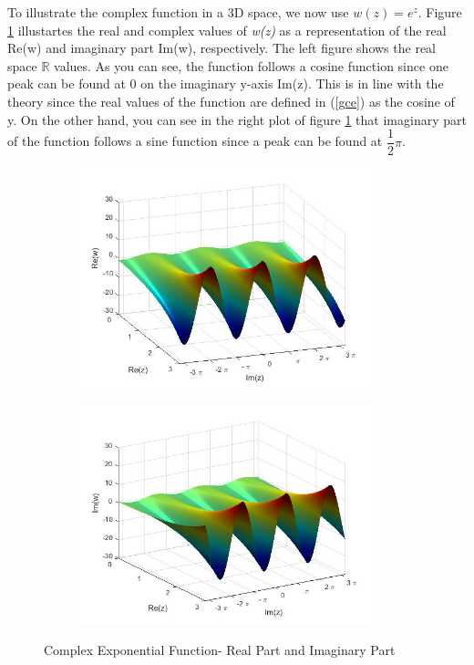 \documentclass[a4paper,11pt]{article}
\begin{document}
To illustrate the complex function in a 3D space,  we now use $w(z)=e^z$.
Figure \ref{plot12} illustartes the real and complex values of \textit{w(z)} as a representation of the real Re(w) and imaginary part Im(w), respectively. The left figure shows the real space $\mathbb{R}$ values. As you can see, the function follows a cosine function since one peak can be found at 0 on the imaginary y-axis Im(z). This is in line with the theory since the real values of the function are defined in (\ref{gce}) as the cosine of y. On the other hand, you can see in the right plot of figure \ref{plot12} that imaginary part of the function follows a sine function since a peak can be found at $\dfrac{1}{2}\pi$.
\begin{figure}[!h]
\begin{subfigure}[c]{0.5\textwidth}
\includegraphics[width=8.5cm]{plot1.jpg}
\end{subfigure}
\begin{subfigure}[c]{0.5\textwidth}
\includegraphics[width=8.5cm]{plot2.jpg}
\end{subfigure}
\caption{Complex Exponential Function- Real Part and Imaginary Part}
\label{plot12}
\end{figure}
\end{document}
